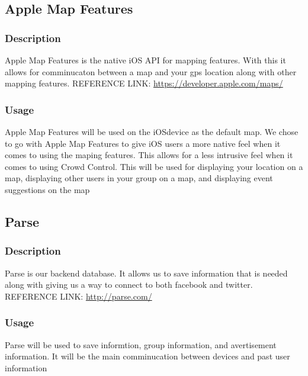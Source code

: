 \subsection{Apple Map Features}
	\subsubsection{Description}
	Apple Map Features is the native iOS API for mapping features. With this it allows for comminucaton between a map and your gps location along with other mapping features.
\newline
REFERENCE LINK: \url{https://developer.apple.com/maps/}
	\subsubsection{Usage}
Apple Map Features will be used on the iOSdevice as the default map. We chose to go with Apple Map Features to give iOS users a more native feel when it comes to using the maping features. This allows for a less intrusive feel when it comes to using Crowd Control. This will be used for displaying your location on a map, displaying other users in your group on a map, and displaying event suggestions on the map

\subsection{Parse}
	\subsubsection{Description}
	Parse is our backend database. It allows us to save information that is needed along with giving us a way to connect to both facebook and twitter.
\newline
REFERENCE LINK: \url{http://parse.com/}
	\subsubsection{Usage}
	Parse will be used to save informtion, group information, and avertisement information. It will be the main comminucation between devices and past user information



